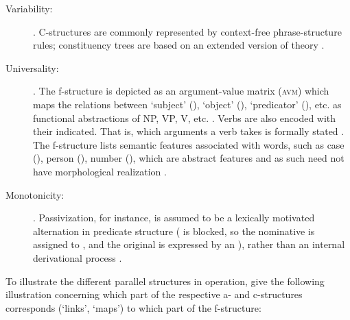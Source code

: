 \begin{description}
\item[Variability:] . 
C-structures are commonly represented by context-free phrase-structure rules; 
constituency trees are based on an extended version of  theory 
\citep[42]{bresnan2016}.

\item[Universality:] . The f-structure is depicted 
as an argument-value matrix (\textsc{avm}) which maps the relations between 
`subject' (\Subj{}), `object' (\Obj{}), `predicator' (\Pred{}), etc. as 
functional abstractions of NP, VP, V, etc. \citep[42]{bresnan2016}. Verbs are 
also encoded with their  indicated. That is, which arguments 
a verb takes is formally stated \citep[15]{bresnan2016}. The f-structure lists 
semantic features associated with words, such as case (\Case{}), person 
(\Pers{}), number (\Num{}), which are abstract features and as such need not 
have morphological realization \citep[43]{bresnan2016}.

\item[Monotonicity:] . Passivization, for instance, is assumed to be a lexically 
motivated alternation in predicate structure (\Subj{} is blocked, so 
the nominative is assigned to \Obj{}, and the original \Subj{} is expressed 
by an \Adjc{}), rather than an internal derivational process 
\citep[23\psqq]{bresnan2016}.

\end{description}

To illustrate the different parallel structures in operation, 
\citet[15]{bresnan2016} give the following illustration concerning which part of 
the respective a- and c-structures corresponds (`links', `maps') to which part 
of the f-structure:

